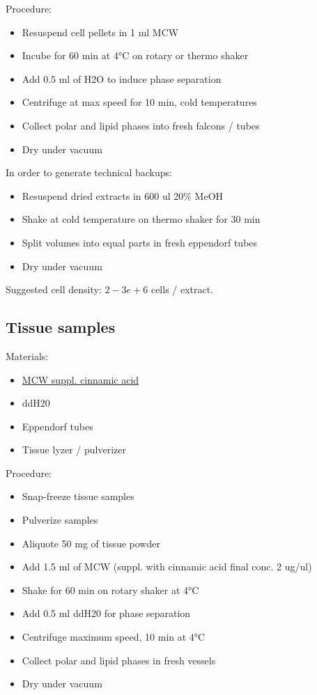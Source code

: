 \documentclass[]{book}
\providecommand{\tightlist}{%
  \setlength{\itemsep}{0pt}\setlength{\parskip}{0pt}}
\theoremstyle{definition}
\theoremstyle{definition}
\theoremstyle{definition}
\theoremstyle{remark}
\begin{document}
Procedure:

\begin{itemize}
\tightlist
\item
  Resuspend cell pellets in 1 ml MCW
\item
  Incube for 60 min at 4°C on rotary or thermo shaker
\item
  Add 0.5 ml of H2O to induce phase separation
\item
  Centrifuge at max speed for 10 min, cold temperatures
\item
  Collect polar and lipid phases into fresh falcons / tubes
\item
  Dry under vacuum
\end{itemize}

In order to generate technical backups:

\begin{itemize}
\tightlist
\item
  Resuspend dried extracts in 600 ul 20\% MeOH
\item
  Shake at cold temperature on thermo shaker for 30 min
\item
  Split volumes into equal parts in fresh eppendorf tubes
\item
  Dry under vacuum
\end{itemize}

Suggested cell density: \(2-3e+6\) cells / extract.

\subsection{Tissue samples}\label{tissue-samples}

Materials:

\begin{itemize}
\tightlist
\item
  \protect\hyperlink{mcw}{MCW suppl. cinnamic acid}
\item
  ddH20
\item
  Eppendorf tubes
\item
  Tissue lyzer / pulverizer
\end{itemize}

Procedure:

\begin{itemize}
\tightlist
\item
  Snap-freeze tissue samples
\item
  Pulverize samples
\item
  Aliquote 50 mg of tissue powder
\item
  Add 1.5 ml of MCW (suppl. with cinnamic acid final conc. 2 ug/ul)
\item
  Shake for 60 min on rotary shaker at 4°C
\item
  Add 0.5 ml ddH20 for phase separation
\item
  Centrifuge maximum speed, 10 min at 4°C
\item
  Collect polar and lipid phases in fresh vessels
\item
  Dry under vacuum
\end{itemize}
\end{document}
